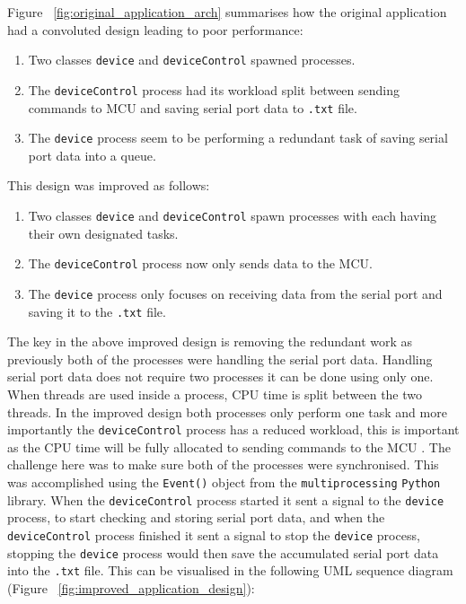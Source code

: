 Figure ~\ref{fig:original_application_arch} summarises how the original application had a convoluted design leading to poor performance:

\begin{enumerate}
	\item Two classes \texttt{device} and \texttt{deviceControl} spawned processes. 
	\item The \texttt{deviceControl} process had its workload split between sending commands to MCU and saving serial port data to \texttt{.txt} file.  
	\item The \texttt{device} process seem to be performing a redundant task of saving serial port data into a queue. 
\end{enumerate}

This design was improved as follows:

\begin{enumerate}
	\item Two classes \texttt{device} and \texttt{deviceControl} spawn processes with each having their own designated tasks.
	\item The \texttt{deviceControl} process now only sends data to the MCU.   
	\item The \texttt{device} process only focuses on receiving data from the serial port and saving it to the \texttt{.txt} file. 
\end{enumerate}

The key in the above improved design is removing the redundant work as previously both of the processes were handling the serial port data. Handling serial port data does not require two processes it can be done using only one. When threads are used inside a process, CPU time is split between the two threads. In the improved design both processes only perform one task and more importantly the \texttt{deviceControl} process has a reduced workload, this is important as the CPU time will be fully allocated to sending commands to the MCU . The challenge here was to make sure both of the processes were synchronised. This was accomplished using the \texttt{Event()} object from the \texttt{multiprocessing} \texttt{Python} library. When the \texttt{deviceControl} process started it sent a signal to the \texttt{device} process, to start checking and storing serial port data, and when the \texttt{deviceControl} process finished it sent a signal to stop the \texttt{device} process, stopping the \texttt{device} process would then save the accumulated serial port data into the \texttt{.txt} file. This can be visualised in the following UML sequence diagram (Figure ~\ref{fig:improved_application_design}):


